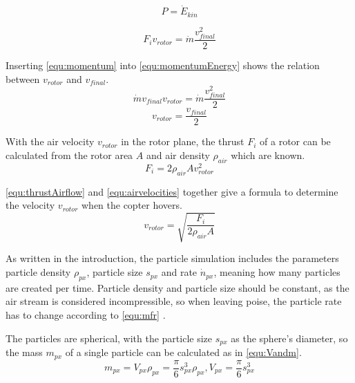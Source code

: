     \begin{equation}
    P = \dot E_{kin}
    \label{equ:consE}
    \end{equation}
    
    \begin{equation}
    F_i v_{rotor} = \dot m \frac{v_{final}^2}{2}
    \label{equ:momentumEnergy}
    \end{equation}
    
    Inserting \ref{equ:momentum} into \ref{equ:momentumEnergy} shows the relation between $v_{rotor}$ and $v_{final}$.
    \begin{equation}
    \dot m v_{final}  v_{rotor} = \dot m \frac{v_{final}^2}{2}
    \end{equation}
    \begin{equation}
     v_{rotor} = \frac{v_{final}}{2}
     \label{equ:airvelocities}
    \end{equation}
    
    With the air velocity $v_{rotor}$ in the rotor plane, the thrust $F_i$ of a rotor can be calculated from the rotor area $A$ and air density $\rho_{air}$ which are known.
    \begin{equation}
    F_i = 2 \rho_{air} A v_{rotor}^2
    \label{equ:thrustAirflow}
    \end{equation}
    
    \ref{equ:thrustAirflow} and \ref{equ:airvelocities} together give a formula to determine the  velocity $v_{rotor}$  when the copter hovers.
    \begin{equation}
    v_{rotor}= \sqrt{\frac{ F_i}{2 \rho_{air} A}}
    \end{equation}
    
    As written in the introduction, the particle simulation includes the parameters particle density $\rho_{px}$, particle size $s_{px}$ and rate $\dot n_{px}$, meaning how many particles are created per time. 
    Particle density and particle size should be constant, as the air stream is considered incompressible, so when leaving poise, the particle rate has to change according to \ref{equ:mfr} \cite{deeg2006modeling}.
    
    The particles are spherical, with the particle size $s_{px}$ as the sphere's diameter, so the mass $m_{px}$ of a single particle can be calculated as in \ref{equ:Vandm}.
    \begin{equation}
    m_{px} = V_{px}  \rho_{px}  =  \frac{\pi}{6}s_{px}^3  \rho_{px},  V_{px}  = \frac{\pi}{6}s_{px}^3
    \label{equ:Vandm}
    \end{equation}
    
